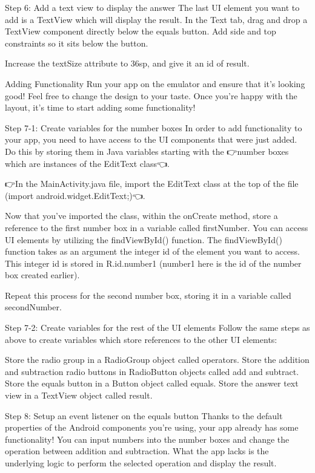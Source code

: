     Step 6: Add a text view to display the answer
        The last UI element you want to add is a TextView which will display the result. In the Text tab, drag and drop a TextView component directly below the equals button. Add side and top constraints so it sits below the button.

        Increase the textSize attribute to 36sp, and give it an id of result.

Adding Functionality
        Run your app on the emulator and ensure that it’s looking good! Feel free to change the design to your taste. Once you’re happy with the layout, it’s time to start adding some functionality!

    Step 7-1: Create variables for the number boxes
        In order to add functionality to your app, you need to have access to the UI components that were just added. Do this by storing them in Java variables starting with the 👉number boxes which are instances of the EditText class👈.

        👉In the MainActivity.java file, import the EditText class at the top of the file (import android.widget.EditText;)👈.

        Now that you’ve imported the class, within the onCreate method, store a reference to the first number box in a variable called firstNumber. You can access UI elements by utilizing the findViewById() function. The findViewById() function takes as an argument the integer id of the element you want to access. This integer id is stored in R.id.number1 (number1 here is the id of the number box created earlier).

        Repeat this process for the second number box, storing it in a variable called secondNumber.

    Step 7-2: Create variables for the rest of the UI elements
        Follow the same steps as above to create variables which store references to the other UI elements:

        Store the radio group in a RadioGroup object called operators.
        Store the addition and subtraction radio buttons in RadioButton objects called add and subtract.
        Store the equals button in a Button object called equals.
        Store the answer text view in a TextView object called result.

    Step 8: Setup an event listener on the equals button
        Thanks to the default properties of the Android components you’re using, your app already has some functionality! You can input numbers into the number boxes and change the operation between addition and subtraction. What the app lacks is the underlying logic to perform the selected operation and display the result.

